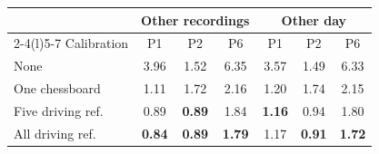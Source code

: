 \begin{tabular}{@{}lcccccc@{}}
\toprule
 & \multicolumn{3}{c}{Other recordings} & \multicolumn{3}{c}{Other day} \\
\cmidrule(lr){2-4}\cmidrule(l){5-7}
Calibration & P1 & P2 & P6 & P1 & P2 & P6 \\
\midrule
None & 3.96 & 1.52 & 6.35 & 3.57 & 1.49 & 6.33 \\
One chessboard & 1.11 & 1.72 & 2.16 & 1.20 & 1.74 & 2.15 \\
Five driving ref. & 0.89 & \textbf{0.89} & 1.84 & \textbf{1.16} & 0.94 & 1.80 \\
All driving ref. & \textbf{0.84} & \textbf{0.89} & \textbf{1.79} & 1.17 & \textbf{0.91} & \textbf{1.72} \\
\bottomrule
\end{tabular}
